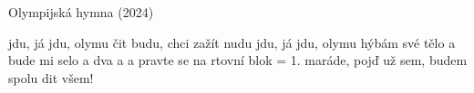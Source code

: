 \begin{TEXT}{Olympijská hymna  (2024)}

\SLOKA {} jdu, já jdu,  olymu\NL
{}čit budu, chci zažít nudu\NL
{} jdu, já jdu,  olymu\NL
{}hýbám své tělo a bude mi selo
\REFREN {} a dva a  a \NL
{}pravte se na rtovní blok
\SLOKA = 1.
\SLOKA* {}maráde, pojď už sem, budem spolu dit všem!
\REFRENHRAJ
\end{TEXT}
